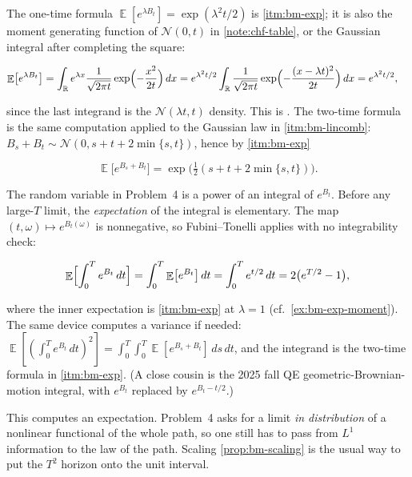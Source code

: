 \documentclass[11pt,a4paper]{article}
\DeclareMathOperator{\E}{\mathbb{E}}
\begin{document}
\begin{example}
\label{ex:bm-exp-moment}
The one-time formula \(\E[e^{\lambda B_t}]=\exp(\lambda^2 t/2)\) is \cref{itm:bm-exp}; it is also the moment generating function of \(\mathcal{N}(0,t)\) in \cref{note:chf-table}, or the Gaussian integral after completing the square:

\[
\begin{aligned}
\E\bigl[e^{\lambda B_t}\bigr]
&=
\int_{\mathbb{R}}
e^{\lambda x}
\frac{1}{\sqrt{2\pi t}}
\exp\Bigl(-\frac{x^2}{2t}\Bigr)\,dx
=
e^{\lambda^2 t/2}
\int_{\mathbb{R}}
\frac{1}{\sqrt{2\pi t}}
\exp\Bigl(-\frac{(x-\lambda t)^2}{2t}\Bigr)\,dx
=
e^{\lambda^2 t/2},
\end{aligned}
\]

since the last integrand is the \(\mathcal{N}(\lambda t,t)\) density. This is \citep[Exercise~6.22]{brzezniak1999}. The two-time formula is the same computation applied to the Gaussian law in \cref{itm:bm-lincomb}: \(B_s+B_t\sim\mathcal{N}(0,s+t+2\min\{s,t\})\), hence by \cref{itm:bm-exp}

\[
\E\bigl[e^{B_s+B_t}\bigr]
=
\exp\bigl(\tfrac12(s+t+2\min\{s,t\})\bigr).
\]
\end{example}

\begin{example}
\label{ex:bm-fubini-exp}
The random variable in Problem~4 is a power of an integral of \(e^{B_t}\). Before any large-\(T\) limit, the \emph{expectation} of the integral is elementary. The map \((t,\omega)\mapsto e^{B_t(\omega)}\) is nonnegative, so Fubini--Tonelli applies with no integrability check:

\[
\E\Bigl[\int_0^T e^{B_t}\,dt\Bigr]
=
\int_0^T \E\bigl[e^{B_t}\bigr]\,dt
=
\int_0^T e^{t/2}\,dt
=
2\bigl(e^{T/2}-1\bigr),
\]

where the inner expectation is \cref{itm:bm-exp} at \(\lambda=1\) (cf.\ \cref{ex:bm-exp-moment}). The same device computes a variance if needed: \(\E[(\int_0^T e^{B_t}\,dt)^2]=\int_0^T\int_0^T \E[e^{B_s+B_t}]\,ds\,dt\), and the integrand is the two-time formula in \cref{itm:bm-exp}. (A close cousin is the 2025 fall QE geometric-Brownian-motion integral, with \(e^{B_t}\) replaced by \(e^{B_t-t/2}\).)

This computes an expectation. Problem~4 asks for a limit \emph{in distribution} of a nonlinear functional of the whole path, so one still has to pass from \(L^1\) information to the law of the path. Scaling \cref{prop:bm-scaling} is the usual way to put the \(T^2\) horizon onto the unit interval.
\end{example}
\end{document}
